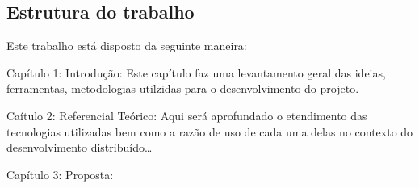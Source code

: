 \subsection{Estrutura do trabalho}

Este trabalho está disposto da seguinte maneira:

Capítulo 1: Introdução: Este capítulo faz uma levantamento geral das ideias, ferramentas, metodologias utilzidas para o desenvolvimento do projeto.

Caítulo 2: Referencial Teórico: Aqui será aprofundado o etendimento das tecnologias utilizadas bem como a razão de uso de cada uma delas no contexto do desenvolvimento distribuído\dots

Capítulo 3: Proposta: 